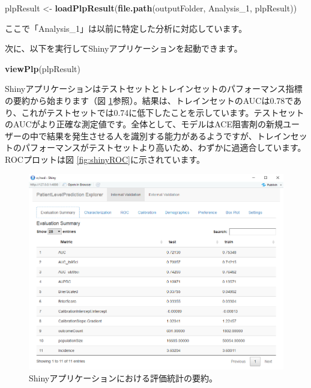 \documentclass[
  11pt]{book}
\newenvironment{Shaded}{\begin{snugshade}}{\end{snugshade}}
\newcommand{\FunctionTok}[1]{\textcolor[rgb]{0.13,0.29,0.53}{\textbf{#1}}}
\newcommand{\NormalTok}[1]{#1}
\newcommand{\OtherTok}[1]{\textcolor[rgb]{0.56,0.35,0.01}{#1}}
\newcommand{\StringTok}[1]{\textcolor[rgb]{0.31,0.60,0.02}{#1}}
\theoremstyle{definition}
\theoremstyle{definition}
\theoremstyle{definition}
\theoremstyle{definition}
\theoremstyle{remark}
\begin{document}
\begin{Shaded}
\begin{Highlighting}[]
\NormalTok{plpResult }\OtherTok{\textless{}{-}} \FunctionTok{loadPlpResult}\NormalTok{(}\FunctionTok{file.path}\NormalTok{(outputFolder,}
                                     \StringTok{\textquotesingle{}Analysis\_1\textquotesingle{}}\NormalTok{,}
                                     \StringTok{\textquotesingle{}plpResult\textquotesingle{}}\NormalTok{))}
\end{Highlighting}
\end{Shaded}

ここで「Analysis\_1」は以前に特定した分析に対応しています。

次に、以下を実行してShinyアプリケーションを起動できます。

\begin{Shaded}
\begin{Highlighting}[]
\FunctionTok{viewPlp}\NormalTok{(plpResult)}
\end{Highlighting}
\end{Shaded}

Shinyアプリケーションはテストセットとトレインセットのパフォーマンス指標の要約から始まります（図 \ref{fig:shinySummary}参照）。結果は、トレインセットのAUCは0.78であり、これがテストセットでは0.74に低下したことを示しています。テストセットのAUCがより正確な測定値です。全体として、モデルはACE阻害剤の新規ユーザーの中で結果を発生させる人を識別する能力があるようですが、トレインセットのパフォーマンスがテストセットより高いため、わずかに過適合しています。ROCプロットは図 \ref{fig:shinyROC}に示されています。

\begin{figure}
\includegraphics[width=1\linewidth]{images/PatientLevelPrediction/shinysummary} \caption{Shinyアプリケーションにおける評価統計の要約。}\label{fig:shinySummary}
\end{figure}
\end{document}
